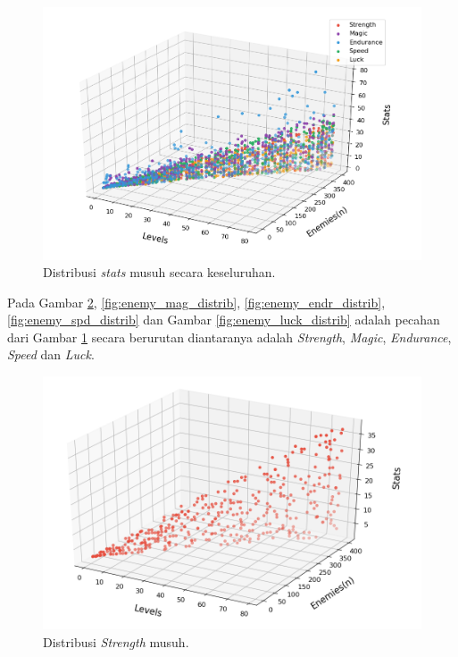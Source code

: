 \begin{figure} [!h] \centering
	\includegraphics[scale=0.58]{img/EnemyStatsDistrib.png}
	\caption{Distribusi \textit{stats} musuh secara keseluruhan.}
	\label{fig:enemy_stats_distrib}
\end{figure}

Pada Gambar \ref{fig:enemy_str_distrib}, \ref{fig:enemy_mag_distrib}, \ref{fig:enemy_endr_distrib}, \ref{fig:enemy_spd_distrib} dan Gambar \ref{fig:enemy_luck_distrib} adalah pecahan dari Gambar \ref{fig:enemy_stats_distrib} secara berurutan diantaranya adalah \textit{Strength}, \textit{Magic}, \textit{Endurance}, \textit{Speed} dan \textit{Luck}.

\begin{figure} [!h] \centering
	\includegraphics[scale=0.55]{img/EnemyStrengthDistrib.png}
	\caption{Distribusi \textit{Strength} musuh.}
	\label{fig:enemy_str_distrib}
\end{figure}

